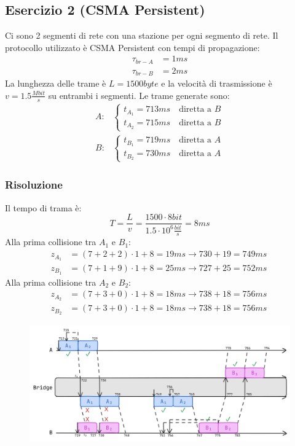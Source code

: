 \documentclass[a4paper]{article}
\begin{document}
\subsection{Esercizio 2 (CSMA Persistent)}
Ci sono 2 segmenti di rete con una stazione per ogni segmento di rete. Il protocollo
utilizzato è CSMA Persistent con tempi di propagazione:
\[
\begin{aligned}
  \tau_{br-A} &= 1ms \\
  \tau_{br-B} &= 2ms
\end{aligned}
\] 
La lunghezza delle trame è \( L = 1500 byte\) e la velocità di trasmissione è
\( v = 1.5 \frac{Mbit}{s} \) su entrambi i segmenti. Le trame generate sono:
\[
\begin{aligned}
  A: & \begin{cases}
    t_{A_1} = 713ms \quad \text{diretta a }B\\
    t_{A_2} = 715ms \quad \text{diretta a }B
  \end{cases}\\
    B: & \begin{cases}
      t_{B_1} = 719ms \quad \text{diretta a }A\\
      t_{B_2} = 730ms \quad \text{diretta a }A
    \end{cases}
\end{aligned}
\] 

\subsubsection{Risoluzione}
Il tempo di trama è:
\[
T = \frac{L}{v} = \frac{1500 \cdot  8bit}{1.5 \cdot  10^6 \frac{bit}{s}} = 8ms
\] 
Alla prima collisione tra \( A_1 \) e \( B_1 \):
\[
\begin{aligned}
  z_{A_1} &= (7+2+2) \cdot 1 + 8 = 19ms \to 730 + 19 = 749ms \\
  z_{B_1} &= (7+1+9) \cdot 1 + 8 = 25ms \to 727 + 25 = 752ms \
\end{aligned}
\] 
Alla prima collisione tra \( A_2 \) e \( B_2 \):
\[
\begin{aligned}
  z_{A_2} &= (7+3+0) \cdot 1 + 8 = 18ms \to 738 + 18 = 756ms \\
  z_{B_2} &= (7+3+0) \cdot 1 + 8 = 18ms \to 738 + 18  = 756ms \
\end{aligned}
\] 
\begin{figure}[H]
  \centering
  \includegraphics[width=1\textwidth]{../figures/es-csma1}
\end{figure}
\end{document}
